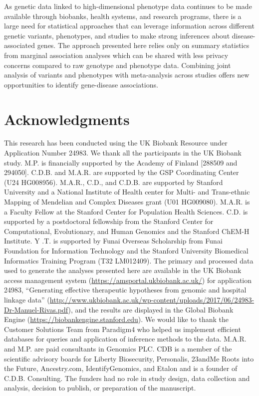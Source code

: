 As genetic data linked to high-dimensional phenotype data continues to be made available through biobanks, health systems, and research programs, there is a large need for statistical approaches that can leverage information across different genetic variants, phenotypes, and studies to make strong inferences about disease-associated genes. The approach presented here relies only on summary statistics from marginal association analyses which can be shared with less privacy concerns compared to raw genotype and phenotype data. Combining joint analysis of variants and phenotypes with meta-analysis across studies offers new opportunities to identify gene-disease associations.




\section*{Acknowledgments}
This research has been conducted using the UK Biobank Resource under Application Number 24983. We thank all the participants in the UK Biobank study. M.P. is financially supported by the Academy of Finland [288509 and 294050]. C.D.B. and M.A.R. are supported by the GSP Coordinating Center (U24 HG008956). M.A.R., C.D., and C.D.B. are supported by Stanford University and a National Institute of Health center for Multi- and Trans-ethnic Mapping of Mendelian and Complex Diseases grant (U01 HG009080). M.A.R. is a Faculty Fellow at the Stanford Center for Population Health Sciences. C.D. is supported by a postdoctoral fellowship from the Stanford Center for Computational, Evolutionary, and Human Genomics and the Stanford ChEM-H Institute. Y .T. is supported by Funai Overseas Scholarship from Funai Foundation for Information Technology and the Stanford University Biomedical Informatics Training Program (T32 LM012409). The primary and processed data used to generate the analyses presented here are available in the UK Biobank access management system (\url{https://amsportal.ukbiobank.ac.uk/}) for application 24983, ``Generating effective therapeutic hypotheses from genomic and hospital linkage data'' (\url{http://www.ukbiobank.ac.uk/wp-content/uploads/2017/06/24983-Dr-Manuel-Rivas.pdf}), and the results are displayed in the Global Biobank Engine (\url{https://biobankengine.stanford.edu}). We would like to thank the Customer Solutions Team from Paradigm4 who helped us implement efficient databases for queries and application of inference methods to the data. M.A.R. and M.P. are paid consultants in Genomics PLC. CDB is a member of the scientific advisory boards for Liberty Biosecurity, Personalis, 23andMe Roots into the Future, Ancestry.com, IdentifyGenomics, and Etalon and is a founder of C.D.B. Consulting. The funders had no role in study design, data collection and analysis, decision to publish, or preparation of the manuscript.

